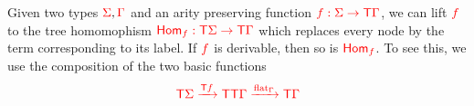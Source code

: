 \noindent \begin{example}\label{ex:morphism} 
Given two types ${\color{red}{\Sigma}}, {\color{red}{\Gamma}}$ and an arity preserving  function ${\color{red}{f:\Sigma\to{\color{red}{\mathsf T}}\Gamma}}$, we can lift ${\color{red}{f}}$ to the tree homomophism  ${\color{red}{\mathsf{Hom}_f:{\color{red}{\mathsf T}}\Sigma\to {\color{red}{\mathsf T}}\Gamma}}$ which replaces every node by the term corresponding to its label. If ${\color{red}{f}}$ is derivable, then so is  ${\color{red}{\mathsf{Hom}_f}}$. To see this, we use the composition of the two basic functions
\begin{align*}
{\color{red}{{\color{red}{\mathsf T}}\Sigma\xrightarrow{{\color{red}{\mathsf T}}f}{\color{red}{\mathsf T}}{\color{red}{\mathsf T}}\Gamma \xrightarrow{{\color{red}{\mathrm{flat}}}_\Gamma} {\color{red}{\mathsf T}}\Gamma}}
\end{align*}
\end{example}


